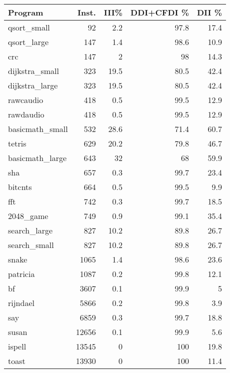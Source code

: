 \begin{tabular}{lrrrr}
\hline
 Program         &   Inst. &   III\% &   DDI+CFDI \% &   DII \% \\
\hline
 qsort\_small     &      92 &    2.2 &         97.8 &    17.4 \\
 qsort\_large     &     147 &    1.4 &         98.6 &    10.9 \\
 crc             &     147 &    2   &         98   &    14.3 \\
 dijkstra\_small  &     323 &   19.5 &         80.5 &    42.4 \\
 dijkstra\_large  &     323 &   19.5 &         80.5 &    42.4 \\
 rawcaudio       &     418 &    0.5 &         99.5 &    12.9 \\
 rawdaudio       &     418 &    0.5 &         99.5 &    12.9 \\
 basicmath\_small &     532 &   28.6 &         71.4 &    60.7 \\
 tetris          &     629 &   20.2 &         79.8 &    46.7 \\
 basicmath\_large &     643 &   32   &         68   &    59.9 \\
 sha             &     657 &    0.3 &         99.7 &    23.4 \\
 bitcnts         &     664 &    0.5 &         99.5 &     9.9 \\
 fft             &     742 &    0.3 &         99.7 &    18.5 \\
 2048\_game       &     749 &    0.9 &         99.1 &    35.4 \\
 search\_large    &     827 &   10.2 &         89.8 &    26.7 \\
 search\_small    &     827 &   10.2 &         89.8 &    26.7 \\
 snake           &    1065 &    1.4 &         98.6 &    23.6 \\
 patricia        &    1087 &    0.2 &         99.8 &    12.1 \\
 bf              &    3607 &    0.1 &         99.9 &     5   \\
 rijndael        &    5866 &    0.2 &         99.8 &     3.9 \\
 say             &    6859 &    0.3 &         99.7 &    18.8 \\
 susan           &   12656 &    0.1 &         99.9 &     5.6 \\
 ispell          &   13545 &    0   &        100   &    19.8 \\
 toast           &   13930 &    0   &        100   &    11.4 \\

\end{tabular}
